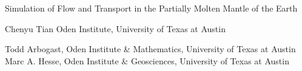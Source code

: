 \documentclass[usenames,dvipsnames,letterpaper,landscape,final]{slides}
\begin{document}
\begin{myslide}
\headingline
		  {\bf\Large\begin{center}
Simulation of Flow and Transport in the Partially Molten Mantle of the Earth
		  \end{center}}

\vfill

\begin{center}{\small\obeylines
Chenyu Tian
\bigskip
		  {Oden Institute, University of Texas at Austin}}
\end{center}

\vfill

{\small\begin{center}
					 Todd Arbogast, Oden Institute \& Mathematics, University of Texas at Austin\\
Marc A. Hesse, Oden Institute \& Geosciences, University of Texas at Austin\\
		  \end{center}}

		  \vspace*{40pt}

\end{myslide}

\end{document}
